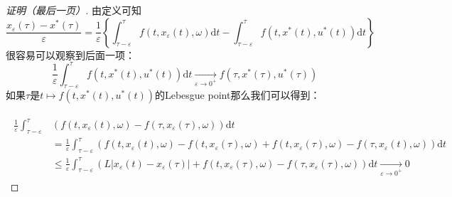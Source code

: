 \documentclass[UTF8, aspectratio=169, 9pt]{ctexbeamer}
\begin{document}
\begin{frame}
\begin{proof}[证明（最后一页）]
  由定义可知
  $$
  \frac{x_{\varepsilon}(\tau)-x^{*}(\tau)}{\varepsilon}=\frac{1}{\varepsilon}\left\{\int_{\tau-\varepsilon}^{\tau} f\left(t, x_{\varepsilon}(t), \omega\right) \mathrm{d} t-\int_{\tau-\varepsilon}^{\tau} f\left(t, x^{*}(t), u^{*}(t)\right) \mathrm{d} t\right\}
  $$
  很容易可以观察到后面一项：
  $$
  \frac{1}{\varepsilon} \int_{\tau-\varepsilon}^{\tau} f\left(t, x^{*}(t), u^{*}(t)\right) \mathrm{d} t \underset{\varepsilon \rightarrow 0^{+}}{\longrightarrow} f\left(\tau, x^{*}(\tau), u^{*}(\tau)\right)
  $$
  如果$\tau$是$t \mapsto f(t, x^*(t),u^*(t))$的Lebesgue point那么我们可以得到：

  \begin{align*}
    \begin{split}
        \frac{1}{\varepsilon} \int_{\tau-\varepsilon}^{\tau} &\left(f\left(t, x_{\varepsilon}(t), \omega\right)-f\left(\tau, x_{\varepsilon}(\tau), \omega\right)\right) \mathrm{d} t \\
        &=\frac{1}{\varepsilon} \int_{\tau-\varepsilon}^{\tau}\left(f\left(t, x_{\varepsilon}(t), \omega\right)-f\left(t, x_{\varepsilon}(\tau), \omega\right)+f\left(t, x_{\varepsilon}(\tau), \omega\right)-f\left(\tau, x_{\varepsilon}(t), \omega\right)\right) \mathrm{d} t \\
        & \leq \frac{1}{\varepsilon} \int_{\tau-\varepsilon}^{\tau}\left(L\left|x_{\varepsilon}(t)-x_{\varepsilon}(\tau)\right|+f\left(t, x_{\varepsilon}(\tau), \omega\right)-f\left(\tau, x_{\varepsilon}(\tau), \omega\right)\right) \mathrm{d} t \underset{\varepsilon \rightarrow 0^{+}}{\longrightarrow} 0
    \end{split}
  \end{align*}


\end{proof}
\end{frame}
\end{document}
